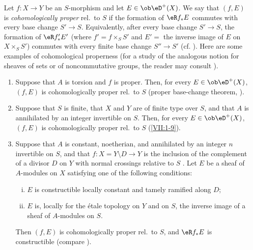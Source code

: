 Let $f:X\to Y$ be an $S$-morphism and let $E\in\ob\eD^+(X)$. We say that
$(f,E)$ is \emph{cohomologically proper} rel.\ to $S$ if the formation of
$\eR f_\ast E$ commutes with every base change $S'\to S$. Equivalently, after
every base change $S'\to S$, the formation of $\eR f_\ast' E'$ (where
$f'=f\times_S S'$ and $E'=$ the inverse image of $E$ on $X\times_S S'$)
commutes with every finite base change $S'' \to S'$ (cf.
). Here are some examples of cohomological properness
(for a study of the analogous notion for sheaves of sets or of
noncommutative groups, the reader may consult ).
\begin{enumerate}[{1.3.}1.]
  \item Suppose that $A$ is torsion and $f$ is proper. Then, for every
    $E\in\ob\eD^+(X)$, $(f,E)$ is cohomologically proper rel.\ to $S$
    (proper base-change theorem, ).
  \item Suppose that $S$ is finite, that $X$ and $Y$ are of finite type over
    $S$, and that $A$ is annihilated by an integer invertible on $S$. Then,
    for every $E\in\ob\eD^+(X)$, $(f,E)$ is cohomologically proper rel.\ to
    $S$ (\ref{VII:1-9}).
  \item Suppose that $A$ is constant, noetherian, and annihilated by an
    integer $n$ invertible on $S$, and that
    $f:X=Y\setminus D\to Y$ is the inclusion of the complement of a divisor
    $D$ on $Y$ with normal crossings relative to $S$
    . Let $E$ be a sheaf of $A$-modules on $X$ satisfying
    one of the following conditions:
    \begin{enumerate}[(i)]
      \item $E$ is constructible locally constant and tamely ramified along
        $D$;
      \item $E$ is, locally for the étale topology on $Y$ and on $S$, the
        inverse image of a sheaf of $A$-modules on $S$.
    \end{enumerate}
    Then $(f,E)$ is cohomologically proper rel.\ to $S$, and $\eR f_\ast E$
    is constructible (compare ).
\end{enumerate} 

